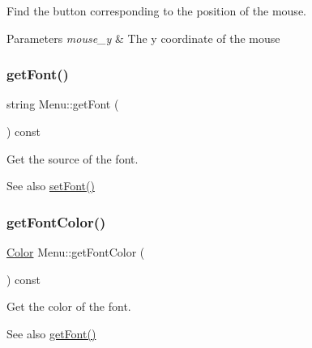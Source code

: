 Find the button corresponding to the position of the mouse. 


\begin{DoxyParams}{Parameters}
{\em mouse\+\_\+y} & The y coordinate of the mouse \\
\hline
\end{DoxyParams}
\mbox{\label{class_menu_abc1b901085908507509201656a68bc37}} 
\subsubsection{\texorpdfstring{get\+Font()}{getFont()}}
{\footnotesize\ttfamily string Menu\+::get\+Font (\begin{DoxyParamCaption}{ }\end{DoxyParamCaption}) const\hspace{0.3cm}{\ttfamily [inline]}}



Get the source of the font. 

\begin{DoxySeeAlso}{See also}
\mbox{\hyperlink{class_menu_ac8b1b161d1aa120db700d03c4b2c9617}{set\+Font()}} 
\end{DoxySeeAlso}
\mbox{\label{class_menu_ada3902ac8609448aa9c292d9082fabcf}} 
\subsubsection{\texorpdfstring{get\+Font\+Color()}{getFontColor()}}
{\footnotesize\ttfamily \mbox{\hyperlink{class_color}{Color}} Menu\+::get\+Font\+Color (\begin{DoxyParamCaption}{ }\end{DoxyParamCaption}) const\hspace{0.3cm}{\ttfamily [inline]}}



Get the color of the font. 

\begin{DoxySeeAlso}{See also}
\mbox{\hyperlink{class_menu_abc1b901085908507509201656a68bc37}{get\+Font()}} 
\end{DoxySeeAlso}
\mbox{\label{class_menu_a0d1f7c0033afca099c71b35d3f5cf23f}} 
